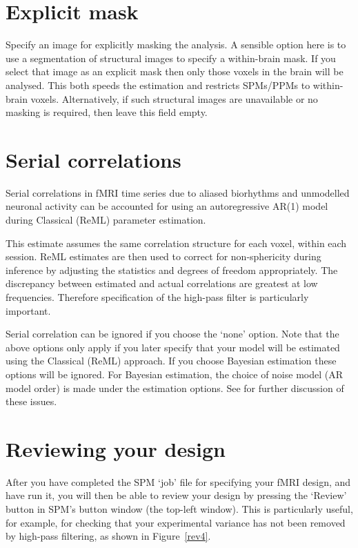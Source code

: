 \documentclass[a4paper,titlepage]{book}
\begin{document}
\section{Explicit mask}
Specify an image for explicitly masking the analysis. A sensible option here is to use a segmentation of structural images to specify a within-brain mask. If you select that image as an explicit mask then only those voxels in the brain will be analysed. This both speeds the estimation and restricts SPMs/PPMs to within-brain voxels. Alternatively, if such structural images are unavailable or no masking is required, then leave this field empty.


\section{Serial correlations}
Serial correlations in fMRI time series due to aliased biorhythms and unmodelled neuronal activity can be accounted for using an autoregressive AR(1) model during Classical (ReML) parameter estimation.  

                                                                                                            

This estimate assumes the same correlation structure for each voxel, within each session.  ReML estimates are then used to correct for non-sphericity during inference by adjusting the statistics and degrees of freedom appropriately.  The discrepancy between estimated and actual correlations are greatest at low frequencies.  Therefore specification of the high-pass filter is particularly important. 

                                                                                                            

Serial correlation can be ignored if you choose the `none' option. Note that the above options only apply if you later specify that your model will be estimated using the Classical (ReML) approach. If you choose Bayesian estimation these options will be ignored. For Bayesian estimation, the choice of noise model (AR model order) is made under the estimation options. See \cite{peb1,vb_fmri_ar} for further discussion of 
these issues.

\section{Reviewing your design \label{explore}}

After you have completed the SPM `job' file for specifying your 
fMRI design, and have run it, you will then be able to review your 
design by pressing the `Review' button in SPM's button window (the 
top-left window). This is particularly useful, for example, for 
checking that your experimental variance has not been removed  
by high-pass filtering, as shown in Figure~\ref{rev4}.
\end{document}
